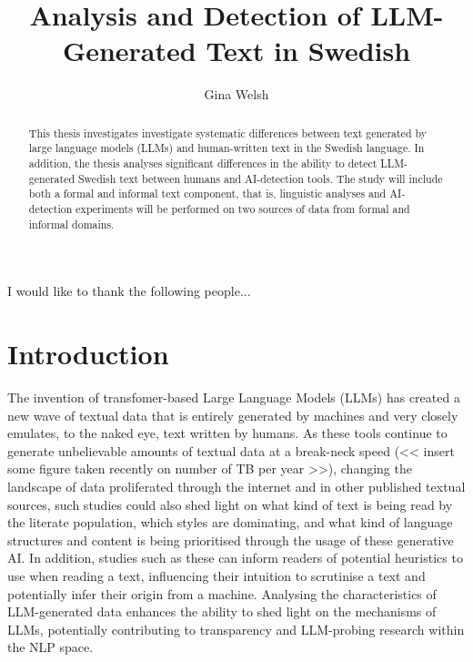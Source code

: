 \documentclass[thesis]{cluu}
\begin{document}
\title{Analysis and Detection of LLM-Generated Text in Swedish}
\author{Gina Welsh}

\maketitle

\begin{abstract}

This thesis investigates investigate systematic differences
between text generated
by large language models (LLMs) and human-written text in the
Swedish language. In addition, the
thesis analyses significant differences in the ability to detect
LLM-generated
Swedish text between humans and AI-detection tools. The study
will include both a formal and informal text
component, that is, linguistic analyses and AI-detection
experiments will be performed on two sources
of data from formal and informal domains.
\end{abstract}

\tableofcontents

I would like to thank the following people...

\chapter{Introduction}
The invention of transfomer-based Large Language Models (LLMs)
has created a new wave of textual data that is entirely
generated by machines and very closely emulates, to the naked
eye, text written by humans. As these tools continue to generate
unbelievable amounts of textual data at a break-neck speed (<<
insert some figure taken recently on number of TB per year >>),
changing the landscape of data proliferated through the internet
and in other published textual sources, such studies could also
shed light on what kind of text is being read by the literate
population, which styles are dominating, and what kind of
language structures and content is being prioritised through the
usage of these generative AI. In addition, studies such as these
can inform readers of potential heuristics to use when reading a
text, influencing their intuition to scrutinise a text and
potentially infer their origin from a machine. Analysing the
characteristics of LLM-generated data enhances the ability to
shed light on the mechanisms of LLMs, potentially contributing
to transparency and LLM-probing research within the NLP space.
\end{document}
